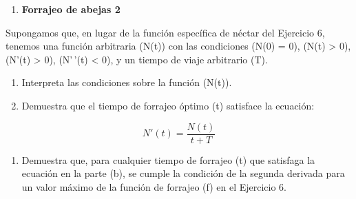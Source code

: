 \documentclass[
]{article}
\providecommand{\tightlist}{%
  \setlength{\itemsep}{0pt}\setlength{\parskip}{0pt}}\usepackage{longtable,booktabs,array}
\begin{document}
\begin{enumerate}
\def\labelenumi{\arabic{enumi}.}
\setcounter{enumi}{11}
\tightlist
\item
  \textbf{Forrajeo de abejas 2}
\end{enumerate}

Supongamos que, en lugar de la función específica de néctar del
Ejercicio 6, tenemos una función arbitraria (N(t)) con las condiciones
(N(0) = 0), (N(t) \textgreater{} 0), (N'(t) \textgreater{} 0), (N'\,'(t)
\textless{} 0), y un tiempo de viaje arbitrario (T).

\begin{enumerate}
\def\labelenumi{\alph{enumi}.}
\item
  Interpreta las condiciones sobre la función (N(t)).
\item
  Demuestra que el tiempo de forrajeo óptimo (t) satisface la ecuación:
\end{enumerate}

\[
N'(t) = \frac{N(t)}{t + T}
\]

\begin{enumerate}
\def\labelenumi{\alph{enumi}.}
\setcounter{enumi}{2}
\tightlist
\item
  Demuestra que, para cualquier tiempo de forrajeo (t) que satisfaga la
  ecuación en la parte (b), se cumple la condición de la segunda
  derivada para un valor máximo de la función de forrajeo (f) en el
  Ejercicio 6.
\end{enumerate}
\end{document}
